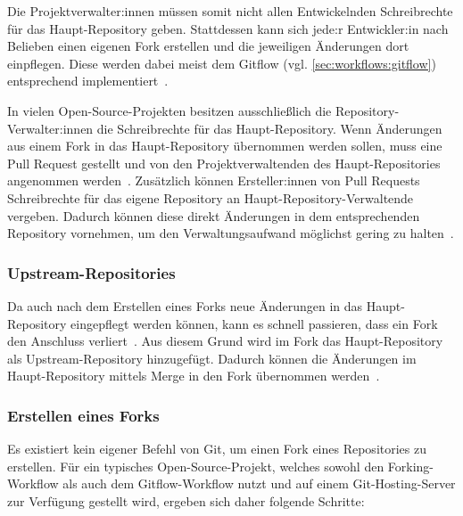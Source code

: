 Die Projektverwalter:innen müssen somit nicht allen Entwickelnden Schreibrechte für das Haupt\hyp Repository geben. Stattdessen kann sich jede:r Entwickler:in nach Belieben einen eigenen Fork erstellen und die jeweiligen Änderungen dort einpflegen. Diese werden dabei meist dem Gitflow (vgl. \autoref{sec:workflows:gitflow}) entsprechend implementiert~\cite{atlassianForkingWorkflow}.

In vielen Open\hyp Source\hyp Projekten besitzen ausschließlich die Repository\hyp Verwalter:innen die Schreibrechte für das Haupt\hyp Repository. Wenn Änderungen aus einem Fork in das Haupt\hyp Repository übernommen werden sollen, muss eine Pull Request gestellt und von den Projektverwaltenden des Haupt\hyp Repositories angenommen werden~\cite{gitHubInformationenZuForks}. Zusätzlich können Ersteller:innen von Pull Requests Schreibrechte für das eigene Repository an Haupt\hyp Repository\hyp Verwaltende vergeben. Dadurch können diese direkt Änderungen in dem entsprechenden Repository vornehmen, um den Verwaltungsaufwand möglichst gering zu halten~\cite{gitHubInformationenZuForks}.


\subsubsection{Upstream\hyp Repositories}

Da auch nach dem Erstellen eines Forks neue Änderungen in das Haupt\hyp Repository eingepflegt werden können, kann es schnell passieren, dass ein Fork den Anschluss verliert~\cite{atlassianForksAndUpstreams}. Aus diesem Grund wird im Fork das Haupt\hyp Repository als Upstream\hyp Repository hinzugefügt. Dadurch können die Änderungen im Haupt\hyp Repository mittels Merge in den Fork übernommen werden~\cite{atlassianForksAndUpstreams}.


\subsubsection{Erstellen eines Forks}

Es existiert kein eigener Befehl von Git, um einen Fork eines Repositories zu erstellen. Für ein typisches Open\hyp Source\hyp Projekt, welches sowohl den Forking\hyp Workflow als auch dem Gitflow\hyp Workflow nutzt und auf einem Git\hyp Hosting\hyp Server zur Verfügung gestellt wird, ergeben sich daher folgende Schritte:

